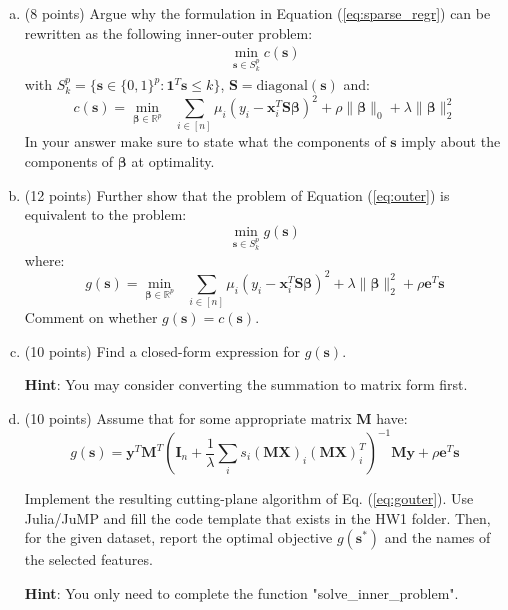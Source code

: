 \documentclass{article}%
\newcommand{\R}{\mathbb{R}}
\begin{document}
\begin{enumerate}[(a)]
    \item (8 points) Argue why the formulation in Equation (\ref{eq:sparse_regr}) can be rewritten as the following inner-outer problem:
    \begin{equation}
    \label{eq:outer}
    \begin{aligned}
        \min_{\bm{s}\in S_k^p}c(\bm{s})
        \end{aligned}
    \end{equation}
    with $S_k^p=\{\bm{s}\in\{0,1\}^p:\bm{1}^T\bm{s}\leq k\}$, $\bm{S}=\text{diagonal}(\bm{s})$ and:
    \begin{equation}\label{eq:s_inner}
        c(\bm{s})=\min_{\boldsymbol{\beta}\in \R^p} \text{  }\sum_{i\in[n]} \mu_i(y_i - \mathbf{x}^T_i \bm{S}\boldsymbol{\beta})^2  + \rho \| \boldsymbol{\beta} \|_0+\lambda \|\bm{\beta}\|_2^2
    \end{equation}
    In your answer make sure to state what the components of $\bm{s}$ imply about the components of $\bm{\beta}$ at optimality.

\item (12 points) Further show that the problem of Equation (\ref{eq:outer}) is equivalent to the problem:
\begin{equation}
    \label{eq:gouter}
    \min_{\bm{s}\in S_k^p}g(\bm{s})
\end{equation}
where:
\begin{equation}
    \label{eq:inner_g}
            g(\bm{s}) = \min_{\boldsymbol{\beta}\in \R^p} \text{  }\sum_{i\in[n]} \mu_i(y_i - \mathbf{x}^T_i \bm{S}\boldsymbol{\beta})^2  +\lambda \|\bm{\beta}\|_2^2 +\rho \bm{e}^T\bm{s}
\end{equation}
Comment on whether $g(\bm{s})=c(\bm{s})$.
\\

\item (10 points) Find a closed-form expression for $g(\bm{s})$. 


\textbf{Hint}: You may consider converting the summation to matrix form first.


\item (10 points) Assume that for some appropriate matrix $\bm{M}$ have:
\begin{equation}
        g(\bm{s})=\bm{y}^T\bm{M}^T(\bm{I}_n+\frac{1}{\lambda} \sum_i s_i(\bm{MX})_i(\bm{MX})_i^T)^{-1}\bm{My}+\rho \bm{e}^T\bm{s}
\end{equation}

Implement the resulting cutting-plane algorithm of Eq. (\ref{eq:gouter}).
Use Julia/JuMP and fill the code template that exists in the HW1 folder. 
Then, for the given dataset, report the optimal objective $g(\bm{s}^*)$ and the names of the selected features.

\textbf{Hint}: You only need to complete the function "solve\_inner\_problem".


\end{enumerate}







\end{document}
